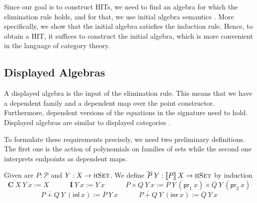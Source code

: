 \documentclass[9pt]{entcs}
\newcommand{\type}[1]{\textsc{#1}}
\newcommand{\term}[1]{\mathsf{#1}}
\newcommand{\constructor}[1]{\mathbf{#1}}
\newcommand{\hset}{\type{hSet}} %
\newcommand{\0}{\textbf{0}} %
\newcommand{\inl}{\term{inl}} %
\newcommand{\inr}{\term{inr}} %
\newcommand{\prl}{\term{pr}_1} %
\newcommand{\prr}{\term{pr}_2} %
\newcommand{\Def}{:=} %
\newcommand{\poly}{\mathcal{P}} %
\newcommand{\C}{\constructor{C}} %
\newcommand{\I}{\constructor{I}} %
\newcommand{\sumP}[2]{#1 + #2} %
\newcommand{\prodP}[2]{#1 \times #2} %
\newcommand{\semP}[1]{\llbracket #1 \rrbracket} %
\newcommand{\polydact}[2]{\overline{#1} \> #2} %
\newcommand{\remove}[1]{} %
\begin{document}
Since our goal is to construct HITs, we need to find an algebra for which the elimination rule holds, and for that, we use initial algebra semantics \cite{AltenkirchCDKF18,AwodeyGS12,Sojakova15}.
More specifically, we show that the initial algebra satisfies the induction rule.
Hence, to obtain a HIT, it suffices to construct the initial algebra, which is more convenient in the language of category theory.

\subsection{Displayed Algebras}
\label{ref:induction}
A displayed algebra is the input of the elimination rule.
This means that we have a dependent family and a dependent map over the point constructor.
Furthermore, dependent versions of the equations in the signature need to hold.
Displayed algebras are similar to displayed categories \cite{AhrensL19}.

To formulate these requirements precisely, we need two preliminary definitions.
The first one is the action of polynomials on families of sets while the second one interprets endpoints as dependent maps.

\begin{definition}
Given are $P : \poly$ and $Y : X \rightarrow \hset$.
We define $\polydact{P}{Y} : \semP{P} \> X \rightarrow \hset$ by induction
\[
\polydact{\C \> X}{Y} \> x \Def X
\quad \quad \quad
\polydact{\I}{Y} \> x \Def Y \> x
\quad \quad \quad
\polydact{\prodP{P}{Q}}{Y} \> x \Def \polydact{P}{Y} \> (\prl \> x) \times \polydact{Q}{Y} \> (\prr \> x)
\]
\[
\polydact{\sumP{P}{Q}}{Y} \> (\inl \> x) \Def \polydact{P}{Y} \> x
\quad \quad \quad
\polydact{\sumP{P}{Q}}{Y} \> (\inr \> x) \Def \polydact{Q}{Y} \> x
\]
\remove{
\begin{itemize}
	\item $\polydact{\C \> X}{Y} \> x \Def X$;
	\item $\polydact{\I}{Y} \> x \Def Y \> x$;
	\item $\polydact{\sumP{P}{Q}}{Y} \> (\inl \> x) \Def \polydact{P}{Y} \> x$;
	\item $\polydact{\sumP{P}{Q}}{Y} \> (\inr \> x) \Def \polydact{Q}{Y} \> x$;
	\item $\polydact{\prodP{P}{Q}}{Y} \> x \Def \polydact{P}{Y} \> (\prl \> x) \times \polydact{Q}{Y} \> (\prr \> x)$.
\end{itemize}
}
\end{definition}
\end{document}
